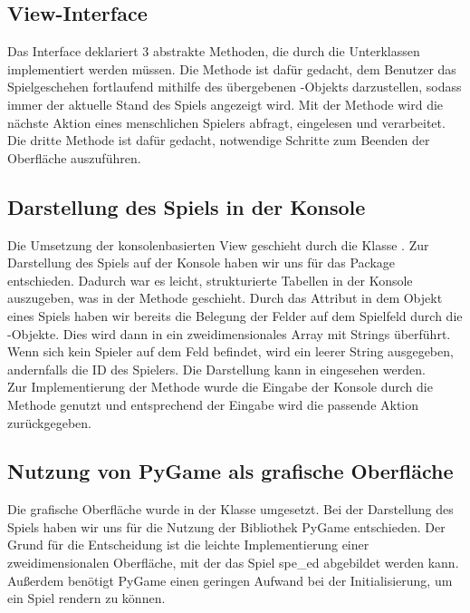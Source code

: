 \subsection{View-Interface}
\label{subsec:interface-view}

Das Interface  deklariert 3 abstrakte Methoden, die durch die Unterklassen implementiert werden müssen.
Die Methode  ist dafür gedacht, dem Benutzer das Spielgeschehen fortlaufend mithilfe des
übergebenen -Objekts darzustellen, sodass immer der aktuelle Stand des Spiels angezeigt wird.
Mit der Methode  wird die nächste Aktion eines menschlichen Spielers abfragt, eingelesen und
verarbeitet.
Die dritte Methode  ist dafür gedacht, notwendige Schritte zum Beenden der Oberfläche auszuführen.

\subsection{Darstellung des Spiels in der Konsole}
\label{subsec:oberflaeche-konsole}

Die Umsetzung der konsolenbasierten View geschieht durch die Klasse .
Zur Darstellung des Spiels auf der Konsole haben wir uns für das Package  
entschieden.
Dadurch war es leicht, strukturierte Tabellen in der Konsole auszugeben, was in der Methode 
geschieht.
Durch das Attribut  in dem Objekt eines Spiels haben wir bereits die Belegung der Felder auf dem Spielfeld
durch die -Objekte.
Dies wird dann in ein zweidimensionales Array mit Strings überführt.
Wenn sich kein Spieler auf dem Feld befindet, wird ein leerer String ausgegeben, andernfalls die ID des Spielers.
Die Darstellung kann in  eingesehen werden. \\

Zur Implementierung der Methode  wurde die Eingabe der Konsole durch die Methode 
genutzt und entsprechend der Eingabe wird die passende Aktion zurückgegeben.

\subsection{Nutzung von PyGame als grafische Oberfläche}
\label{subsec:oberflaeche-pygame}

Die grafische Oberfläche wurde in der Klasse  umgesetzt.
Bei der Darstellung des Spiels haben wir uns für die Nutzung der Bibliothek PyGame entschieden.
Der Grund für die Entscheidung ist die leichte Implementierung einer zweidimensionalen Oberfläche, mit der das Spiel
spe\_ed abgebildet werden kann.
Außerdem benötigt PyGame einen geringen Aufwand bei der Initialisierung, um ein Spiel rendern zu können.  \\

